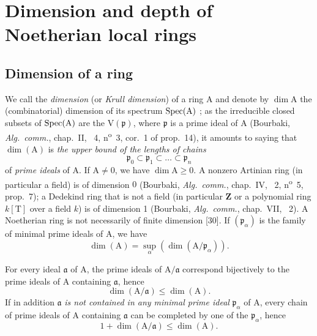 \section{Dimension and depth of Noetherian local rings}
\label{section:0.16}

\subsection{Dimension of a ring}
\label{subsection:0.16.1}
\label{0.16.1}

\begin{env}[16.1.1]
\label{0.16.1.1}
We call the \emph{dimension} (or \emph{Krull dimension}) of a ring $\mathrm{A}$ and denote by $\dim\mathrm{A}$ the (combinatorial) dimension of its spectrum $\operatorname{Spec}(\mathrm{A})$ ; as the irreducible closed subsets of $\operatorname{Spec}(\mathrm{A})$ are the $\mathrm{V}(\mathfrak{p})$, where $\mathfrak{p}$ is a prime ideal of $\mathrm{A}$ (Bourbaki, \emph{Alg.~comm.}, chap.~II, \textsection~4, n\textsuperscript{o}~3, cor.~1 of prop.~14), it amounts to saying that $\dim(\mathrm{A})$ is \emph{the upper bound of the lengths of chains} 
\[
  \mathfrak{p}_0\subset\mathfrak{p}_1\subset\ldots\subset\mathfrak{p}_n
\]
of \emph{prime ideals} of $\mathrm{A}$.
If $\mathrm{A}\neq 0$, we have $\dim\mathrm{A}\geq 0$.
A nonzero Artinian ring (in particular a field) is of dimension $0$ (Bourbaki, \emph{Alg.~comm.}, chap.~IV, \textsection~2, n\textsuperscript{o}~5, prop.~7); a Dedekind ring that is not a field (in particular $\mathbf{Z}$ or a polynomial ring $k[\mathrm{T}]$ over a field $k$) is of dimension 1 (Bourbaki, \emph{Alg.~comm.}, chap.~VII, \textsection~2).
A Noetherian ring is not necessarily of finite dimension [30].
If $(\mathfrak{p}_\alpha)$ is the family of minimal prime ideals of $\mathrm{A}$, we have 
\begin{equation}
\label{0.16.1.1.1}
\tag{16.1.1.1}
  \dim(\mathrm{A})=\sup_\alpha(\dim(\mathrm{A}/\mathfrak{p}_\alpha)).
\end{equation}
\end{env}

\begin{env}[16.1.2]
\label{0.16.1.2}
For every ideal $\mathfrak{a}$ of $\mathrm{A}$, the prime ideals of $\mathrm{A}/\mathfrak{a}$ correspond bijectively to the prime ideals of $\mathrm{A}$ containing $\mathfrak{a}$, hence
\begin{equation}
\label{0.16.1.2.1}
\tag{16.1.2.1}
  \dim(\mathrm{A}/\mathfrak{a})\leq\dim(\mathrm{A}).
\end{equation}
If in addition $\mathfrak{a}$ \emph{is not contained in any minimal prime ideal} $\mathfrak{p}_\alpha$ of $\mathrm{A}$, every chain of prime ideals of $\mathrm{A}$ containing $\mathfrak{a}$ can be completed by one of the $\mathfrak{p}_\alpha$, hence
\begin{equation}
\label{0.16.1.2.2}
\tag{16.1.2.2}
  1+\dim(\mathrm{A}/\mathfrak{a})\leq\dim(\mathrm{A}).
\end{equation}
\end{env}

